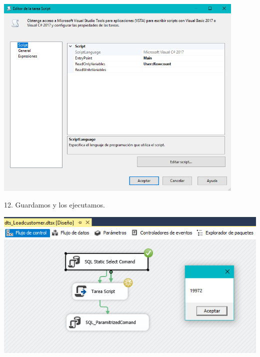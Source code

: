 	\begin{center}
	\includegraphics[width=12cm]{./Imagenes/img26}
	\end{center}	
12. Guardamos y los ejecutamos.\\
	\begin{center}
	\includegraphics[width=15cm]{./Imagenes/img27}
	\end{center}	